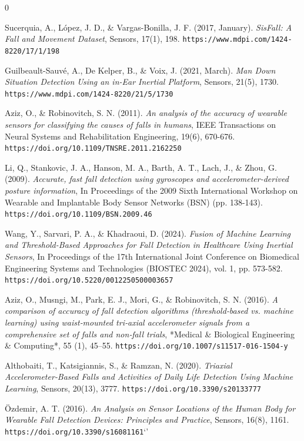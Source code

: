 \documentclass[conference]{IEEEtran}
\begin{document}
\clearpage
\begin{thebibliography}{0} %

Sucerquia, A., López, J. D., \& Vargas-Bonilla, J. F. (2017, January).
{\it SisFall: A Fall and Movement Dataset},
Sensors, 17(1), 198.
{\tt https://www.mdpi.com/1424-8220/17/1/198}

Guilbeault-Sauvé, A., De Kelper, B., \& Voix, J. (2021, March).
{\it Man Down Situation Detection Using an in-Ear Inertial Platform},
Sensors, 21(5), 1730.
{\tt https://www.mdpi.com/1424-8220/21/5/1730}

Aziz, O., \& Robinovitch, S. N. (2011).  
{\it An analysis of the accuracy of wearable sensors for classifying the causes of falls in humans},  
IEEE Transactions on Neural Systems and Rehabilitation Engineering, 19(6), 670-676.  
{\tt https://doi.org/10.1109/TNSRE.2011.2162250}

Li, Q., Stankovic, J. A., Hanson, M. A., Barth, A. T., Lach, J., \& Zhou, G. (2009).  
{\it Accurate, fast fall detection using gyroscopes and accelerometer-derived posture information},  
In Proceedings of the 2009 Sixth International Workshop on Wearable and Implantable Body Sensor Networks (BSN) (pp. 138-143).  
{\tt https://doi.org/10.1109/BSN.2009.46}

Wang, Y., Sarvari, P. A., \& Khadraoui, D. (2024).  
{\it Fusion of Machine Learning and Threshold-Based Approaches for Fall Detection in Healthcare Using Inertial Sensors},  
In Proceedings of the 17th International Joint Conference on Biomedical Engineering Systems and Technologies (BIOSTEC 2024), vol. 1, pp. 573-582.  
{\tt https://doi.org/10.5220/0012250500003657}  

Aziz, O., Musngi, M., Park, E. J., Mori, G., \& Robinovitch, S. N. (2016).  
{\it A comparison of accuracy of fall detection algorithms (threshold‑based vs. machine learning) using waist‑mounted tri‑axial accelerometer signals from a comprehensive set of falls and non‑fall trials},  
*Medical \& Biological Engineering \& Computing*, 55 (1), 45--55.  
{\tt https://doi.org/10.1007/s11517-016-1504-y}

Althobaiti, T., Katsigiannis, S., \& Ramzan, N. (2020).  
{\it Triaxial Accelerometer‑Based Falls and Activities of Daily Life Detection Using Machine Learning},  
Sensors, 20(13), 3777.  
{\tt https://doi.org/10.3390/s20133777}

Özdemir, A. T. (2016).  
{\it An Analysis on Sensor Locations of the Human Body for Wearable Fall Detection Devices: Principles and Practice},  
Sensors, 16(8), 1161.  
{\tt https://doi.org/10.3390/s16081161}`'


\end{thebibliography}
\end{document}
